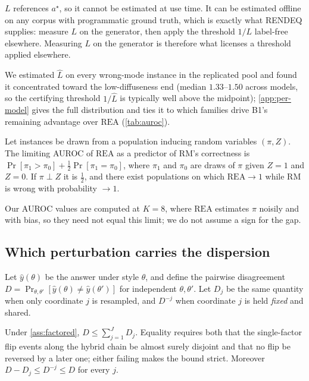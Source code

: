 \documentclass[11pt]{article}
\newcommand{\rea}{\mathrm{REA}}
\newcommand{\rmg}{\mathrm{RM}}
\begin{document}
$L$ references $a^\star$, so it cannot be estimated at use time. It can be estimated offline on any corpus with programmatic ground truth, which is exactly what RENDEQ supplies: measure $L$ on the generator, then apply the threshold $1/L$ label-free elsewhere. Measuring $L$ on the generator is therefore what licenses a threshold applied elsewhere.

We estimated $\hat L$ on every wrong-mode instance in the replicated pool and found it concentrated toward the low-diffuseness end (median $1.33$--$1.50$ across models, so the certifying threshold $1/\hat L$ is typically well above the midpoint); \cref{app:per-model} gives the full distribution and ties it to which families drive B1's remaining advantage over $\rea$ (\cref{tab:auroc}).

\begin{corollary}
\label{cor:auroc}
Let instances be drawn from a population inducing random variables $(\pi, Z)$. The limiting AUROC of $\rea$ as a predictor of $\rmg$'s correctness is $\Pr[\pi_1 > \pi_0] + \tfrac12\Pr[\pi_1 = \pi_0]$, where $\pi_1$ and $\pi_0$ are draws of $\pi$ given $Z{=}1$ and $Z{=}0$. If $\pi \perp Z$ it is $\tfrac12$, and there exist populations on which $\rea \to 1$ while $\rmg$ is wrong with probability $\to 1$.
\end{corollary}

Our AUROC values are computed at $K{=}8$, where $\rea$ estimates $\pi$ noisily and with bias, so they need not equal this limit; we do not assume a sign for the gap.

\subsection{Which perturbation carries the dispersion}
\label{sec:whichperturbation}

Let $\hat y(\theta)$ be the answer under style $\theta$, and define the pairwise disagreement $D = \Pr_{\theta,\theta'}[\hat y(\theta) \neq \hat y(\theta')]$ for independent $\theta,\theta'$. Let $D_j$ be the same quantity when only coordinate $j$ is resampled, and $D^{-j}$ when coordinate $j$ is held \emph{fixed} and shared.

\begin{proposition}
\label{prop:factor}
Under \cref{ass:factored}, $D \le \sum_{j=1}^{J} D_j$. Equality requires both that the single-factor flip events along the hybrid chain be almost surely disjoint and that no flip be reversed by a later one; either failing makes the bound strict. Moreover $D - D_j \le D^{-j} \le D$ for every $j$.
\end{proposition}
\end{document}
